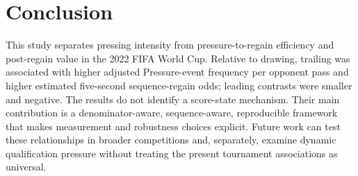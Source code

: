 \section{Conclusion}

This study separates pressing intensity from pressure-to-regain efficiency and post-regain value in the 2022 FIFA World Cup. Relative to drawing, trailing was associated with higher adjusted Pressure-event frequency per opponent pass and higher estimated five-second sequence-regain odds; leading contrasts were smaller and negative. The results do not identify a score-state mechanism. Their main contribution is a denominator-aware, sequence-aware, reproducible framework that makes measurement and robustness choices explicit. Future work can test these relationships in broader competitions and, separately, examine dynamic qualification pressure without treating the present tournament associations as universal.
